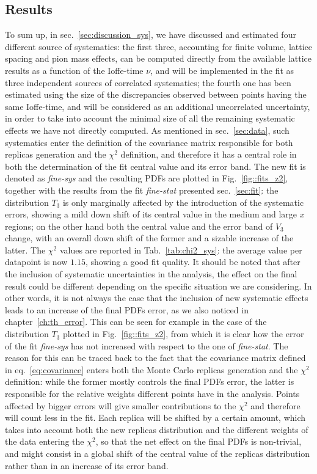 \subsection{Results}
\label{sec:res}
%
To sum up, in sec.~\ref{sec:discussion_sys}, we have discussed and estimated four different source of systematics: 
the first three, accounting for finite volume, lattice spacing and pion mass effects, can be computed directly from the available 
lattice results as a function of the Ioffe-time $\nu$, and will be implemented in the fit 
as three independent sources of correlated systematics; the fourth one has been estimated using
the size of the discrepancies observed between points having the same Ioffe-time, and will be considered
as an additional uncorrelated uncertainty, in order to take into account the minimal size of all the remaining systematic effects
we have not directly computed. 
%
As mentioned in sec.~\ref{sec:data}, such systematics enter the definition of the covariance matrix responsible 
for both replicas generation and the $\chi^2$ definition, and therefore it has a central role in both
the determination of the fit central value and its error band.
The new fit is denoted as \textit{fine-sys} and the resulting PDFs are plotted in Fig.~\ref{fig::fits_z2}, 
together with the results from  the fit \textit{fine-stat} presented sec.~\ref{sec:fit}:
the distribution $T_3$ is only marginally affected by the introduction of the systematic errors,
showing a mild down shift of its central value in the medium and large $x$ regions; on the other hand 
both the central value and the error band of $V_3$ change, with an overall down shift of the former and 
a sizable increase of the latter. 
The $\chi^2$ values are reported in Tab.~\ref{tab:chi2_sys}: the average value per datapoint is now $1.15$, 
showing a good fit quality.
%
It should be noted that after the inclusion of systematic uncertainties in the analysis, the effect
on the final result could be different depending on the specific situation we are considering.
In other words, it is not always the case that the inclusion of new systematic effects leads to an increase 
of the final PDFs error, as we also noticed in chapter~\ref{ch:th_error}. This can be seen for example in the case of the distribution $T_3$ plotted in Fig.~\ref{fig::fits_z2},
from which it is clear how the error of the fit \textit{fine-sys} has not increased with respect to the one of
\textit{fine-stat}. The reason for this can be traced back to the fact that the covariance matrix 
defined in eq.~\eqref{eq:covariance} enters both the Monte Carlo replicas generation and the $\chi^2$ definition:
while the former mostly controls the final PDFs error, 
the latter is responsible for the relative weights different points have in the analysis.
Points affected by bigger errors will give smaller contributions to the $\chi^2$ and therefore 
will count less in the fit. 
Each replica will be shifted by a certain amount, 
which takes into account both the new replicas distribution and the different weights of the data entering the
$\chi^2$, so that the net effect on the final PDFs is non-trivial, and might consist in a global shift
of the central value of the replicas distribution rather than in an increase of its error band.


